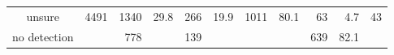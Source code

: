\begin{table}[h]
\begin{tabular}{crrrrrrrrrl}
unsure               & 4491                                                                                  & 1340                                                             & 29.8                                                                                                               & 266                                                                                    & 19.9                                     & 1011                                                                                   & 80.1                                     & 63                                                                                     & 4.7                                      & \multicolumn{1}{r}{43}                                                                 \\
no detection         & \multicolumn{1}{l}{}                                                                  & 778                                                              & \multicolumn{1}{l}{}                                                                                               & 139                                                                                    & \multicolumn{1}{l}{}                     & \multicolumn{1}{l}{}                                                                   & \multicolumn{1}{l}{}                     & 639                                                                                    & 82.1                                     &                                                                                       
\end{tabular}
\end{table}